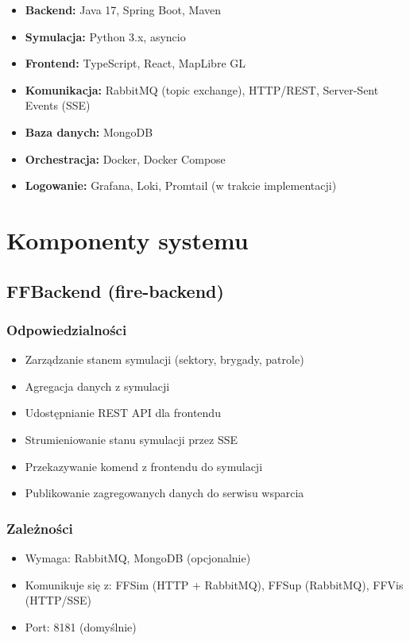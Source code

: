 \documentclass[11pt,a4paper]{article}
\begin{document}
\begin{itemize}
    \item \textbf{Backend:} Java 17, Spring Boot, Maven
    \item \textbf{Symulacja:} Python 3.x, asyncio
    \item \textbf{Frontend:} TypeScript, React, MapLibre GL
    \item \textbf{Komunikacja:} RabbitMQ (topic exchange), HTTP/REST, Server-Sent Events (SSE)
    \item \textbf{Baza danych:} MongoDB
    \item \textbf{Orchestracja:} Docker, Docker Compose
    \item \textbf{Logowanie:} Grafana, Loki, Promtail (w trakcie implementacji)
\end{itemize}

\section{Komponenty systemu}

\subsection{FFBackend (fire-backend)}

\subsubsection{Odpowiedzialności}

\begin{itemize}
    \item Zarządzanie stanem symulacji (sektory, brygady, patrole)
    \item Agregacja danych z symulacji
    \item Udostępnianie REST API dla frontendu
    \item Strumieniowanie stanu symulacji przez SSE
    \item Przekazywanie komend z frontendu do symulacji
    \item Publikowanie zagregowanych danych do serwisu wsparcia
\end{itemize}


\subsubsection{Zależności}

\begin{itemize}
    \item Wymaga: RabbitMQ, MongoDB (opcjonalnie)
    \item Komunikuje się z: FFSim (HTTP + RabbitMQ), FFSup (RabbitMQ), FFVis (HTTP/SSE)
    \item Port: 8181 (domyślnie)
\end{itemize}
\end{document}
